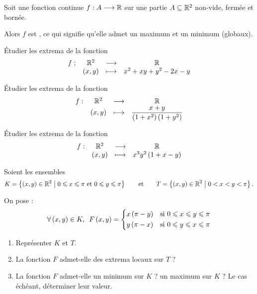 \begin{theo}
Soit une fonction continue \(f:A\longrightarrow\mathbb{R}\) sur une partie \(A\subseteq\mathbb{R}^2\) non-vide, fermée et bornée.

Alors \(f\) est , ce qui signifie qu'elle admet un maximum et un minimum (globaux).
\end{theo}

\begin{exo}[Exercice 8]
Étudier les extrema de la fonction \[\begin{array}[t]{cccc}f : & \mathbb{R}^2 & \longrightarrow & \mathbb{R} \\ & \left(x,y\right) & \longmapsto & x^2+xy+y^2-2x-y\end{array}\]
\end{exo}

\begin{corr}
\end{corr}

\begin{exo}[Exercice 9]
Étudier les extrema de la fonction \[\begin{array}[t]{cccc}f : & \mathbb{R}^2 & \longrightarrow & \mathbb{R} \\ & \left(x,y\right) & \longmapsto & \dfrac{x+y}{\left(1+x^2\right)\left(1+y^2\right)}\end{array}\]
\end{exo}

\begin{corr}
\end{corr}

\begin{exo}[Exercice 10]
Étudier les extrema de la fonction \[\begin{array}[t]{cccc}f : & \mathbb{R}^2 & \longrightarrow & \mathbb{R} \\ & \left(x,y\right) & \longmapsto & x^3y^2\left(1+x-y\right)\end{array}\]
\end{exo}

\begin{corr}
\end{corr}

\begin{exo}
Soient les ensembles \[K=\left\lbrace\left(x,y\right)\in\mathbb{R}^2\;\middle|\;0\leqslant x\leqslant\pi\text{ et }0\leqslant y\leqslant\pi\right\rbrace\qquad\text{et}\qquad T=\left\lbrace\left(x,y\right)\in\mathbb{R}^2\;\middle|\;0<x<y<\pi\right\rbrace.\]

On pose : \[\quantifs{\forall\paren{x,y}\in K}F\paren{x,y}=\begin{dcases}
x\paren{\pi-y} &\text{si }0\leq x\leq y\leq\pi \\
y\paren{\pi-x} &\text{si }0\leq y\leq x\leq\pi
\end{dcases}\]

\begin{enumerate}
    \item Représenter \(K\) et \(T\). \\
    \item La fonction \(F\) admet-elle des extrema locaux sur \(T\) ? \\
    \item La fonction \(F\) admet-elle un minimum sur \(K\) ? un maximum sur \(K\) ? Le cas échéant, déterminer leur valeur.
\end{enumerate}
\end{exo}

